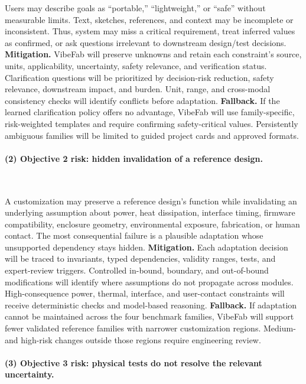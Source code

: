 \documentclass[11pt,letterpaper]{article}
\begin{document}
Users may describe goals as ``portable,'' ``lightweight,'' or ``safe'' without measurable limits. Text, sketches, references, and context may be incomplete or inconsistent. Thus, system may miss a critical requirement, treat inferred values as confirmed, or ask questions irrelevant to downstream design/test decisions.
\textbf{Mitigation.} VibeFab will preserve unknowns and retain each constraint's source, units, applicability, uncertainty, safety relevance, and verification status. Clarification questions will be prioritized by decision-risk reduction, safety relevance, downstream impact, and burden. Unit, range, and cross-modal consistency checks will identify conflicts before adaptation.
\textbf{Fallback.} If the learned clarification policy offers no advantage, VibeFab will use family-specific, risk-weighted templates and require confirming safety-critical values. Persistently ambiguous families will be limited to guided project cards and approved formats.

\paragraph{(2) Objective 2 risk: hidden invalidation of a reference design.}~{}

A customization may preserve a reference design's function while invalidating an underlying assumption about power, heat dissipation, interface timing, firmware compatibility, enclosure geometry, environmental exposure, fabrication, or human contact. The most consequential failure is a plausible adaptation whose unsupported dependency stays hidden.
\textbf{Mitigation.} Each adaptation decision will be traced to invariants, typed dependencies, validity ranges, tests, and expert-review triggers. Controlled in-bound, boundary, and out-of-bound modifications will identify where assumptions do not propagate across modules. High-consequence power, thermal, interface, and user-contact constraints will receive deterministic checks and model-based reasoning.
\textbf{Fallback.} If adaptation cannot be maintained across the four benchmark families, VibeFab will support fewer validated reference families with narrower customization regions. Medium- and high-risk changes outside those regions require engineering review.

\paragraph{(3) Objective 3 risk: physical tests do not resolve the relevant uncertainty.}~{}
\end{document}
